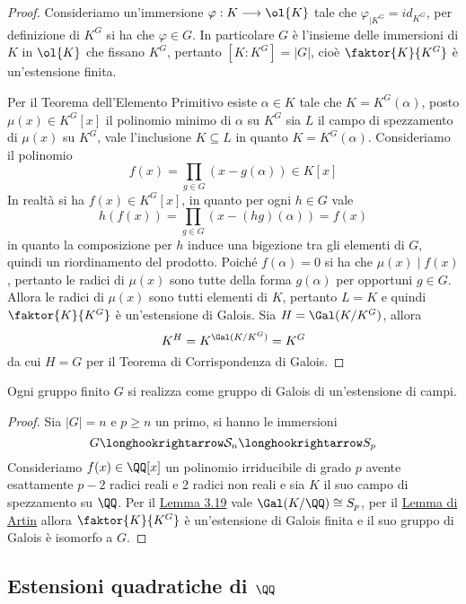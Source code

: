 \documentclass[11pt]{scrartcl}
\begin{document}
	\begin{proof}
		Consideriamo un'immersione $\varphi: K \longrightarrow \ol{K}$ tale che
		$\varphi_{\mid K^G} = id_{K^G}$, per definizione di $K^G$ si ha che 
		$\varphi \in G$. In particolare $G$ è l'insieme delle immersioni di $K$
		in $\ol{K}$ che fissano $K^G$, pertanto $[K:K^G] = |G|$, cioè $\faktor{K}{K^G}$
		è un'estensione finita. 
		
		Per il Teorema dell'Elemento Primitivo esiste $\alpha \in K$ tale che 
		$K = K^G(\alpha)$, posto $\mu(x) \in K^G[x]$ il polinomio minimo di $\alpha$
		su $K^G$ sia $L$ il campo di spezzamento di $\mu(x)$ su $K^G$, vale
		l'inclusione $K \subseteq L$ in quanto $K = K^G(\alpha)$. Consideriamo 
		il polinomio 
		\[
		f(x) = \prod_{g \in G}(x - g(\alpha)) \in K[x]
		\]
		In realtà si ha $f(x) \in K^G[x]$, in quanto per ogni $h \in G$ vale 
		\[
		h(f(x)) = \prod_{g \in G}(x - (hg)(\alpha)) = f(x)
		\]
		in quanto la composizione per $h$ induce una bigezione tra gli elementi di $G$,
		quindi un riordinamento del prodotto. Poiché $f(\alpha) = 0$ si ha che
		$\mu(x)\mid f(x)$, pertanto le radici di $\mu(x)$ sono tutte della forma
		$g(\alpha)$ per opportuni $g \in G$. Allora le radici di $\mu(x)$ sono
		tutti elementi di $K$, pertanto $L = K$ e quindi $\faktor{K}{K^G}$ è 
		un'estensione di Galois. Sia $H = \Gal(K/K^G)$, allora
		\[
		K^H = K^{\Gal(K/K^G)} = K^G
		\]
		da cui $H = G$ per il Teorema di Corrispondenza di Galois.
	\end{proof}
	
	\begin{proposition}
		Ogni gruppo finito $G$ si realizza come gruppo di Galois di un'estensione
		di campi.
	\end{proposition}
	
	\begin{proof}
		Sia $|G| = n$ e $p \geq n$ un primo, si hanno le immersioni
		\[
		G \longhookrightarrow \mathcal{S}_n \longhookrightarrow S_p
		\]
		Consideriamo $f(x) \in \QQ[x]$ un polinomio irriducibile di grado $p$
		avente esattamente $p - 2$ radici reali e 2 radici non reali e sia $K$ 
		il suo campo di spezzamento su $\QQ$. Per il \hyperref[lemma3.19]{Lemma 3.19}
		vale $\Gal(K/\QQ) \cong S_p$, per il \hyperref[lemma3.20]{Lemma di Artin}
		allora $\faktor{K}{K^G}$ è un'estensione di Galois finita e il suo gruppo
		di Galois è isomorfo a $G$.
	\end{proof}
	
	\newpage
	
	\subsection{Estensioni quadratiche di \texorpdfstring{$\QQ$}{ℚ}}
	
\end{document}

